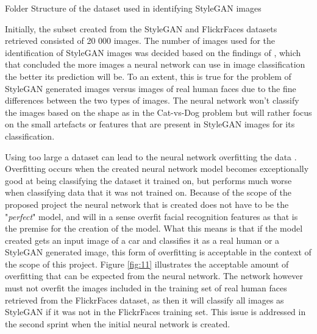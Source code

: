 \begin{table}[H]%
\caption{Folder Structure of the dataset used in identifying StyleGAN images}
\label{tabl:folders}
\center
\small
{}
\end{table}

Initially, the subset created from the StyleGAN and FlickrFaces datasets retrieved consisted of 20 000 images. The number of images used for the identification of StyleGAN images was decided based on the findings of \cite{Nasr2016}, which that concluded the more images a neural network can use in image classification the better its prediction will be. To an extent, this is true for the problem of StyleGAN generated images versus images of real human faces due to the fine differences between the two types of images. The neural network won't classify the images based on the shape as in the Cat-vs-Dog problem but will rather focus on the small artefacts or features that are present in StyleGAN images for its classification. 

Using too large a dataset can lead to the neural network overfitting the data \citep{Trask2019}. Overfitting occurs when the created neural network model becomes exceptionally good at being classifying the dataset it trained on, but performs much worse when classifying data that it was not trained on. Because of the scope of the proposed project the neural network that is created does not have to be the "\textit{perfect}" model, and will in a sense overfit facial recognition features as that is the premise for the creation of the model. What this means is that if the model created gets an input image of a car and classifies it as a real human or a StyleGAN generated image, this form of overfitting is acceptable in the context of the scope of this project. Figure \ref{fig:11} illustrates the acceptable amount of overfitting that can be expected from the neural network. The network however must not overfit the images included in the training set of real human faces retrieved from the FlickrFaces dataset, as then it will classify all images as StyleGAN if it was not in the FlickrFaces training set. This issue is addressed in the second sprint when the initial neural network is created. 
  
